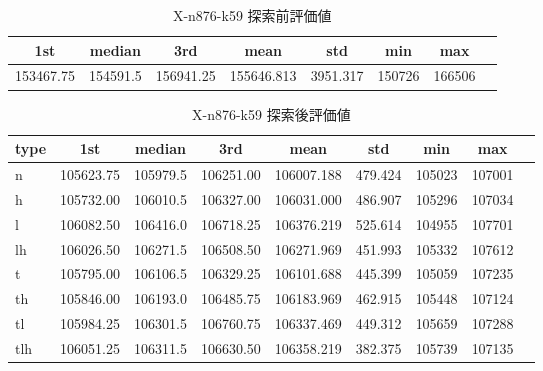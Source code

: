 \begin{table}[htbp]
    \centering
    \caption{X-n876-k59 探索前評価値}
    \begin{tabular}{|l|l|l|l|l|l|l|l|}\hline
    \multicolumn{1}{|c|}{\textbf{1st}}
    &\multicolumn{1}{c|}{\textbf{median}}
    &\multicolumn{1}{c|}{\textbf{3rd}}
    &\multicolumn{1}{c|}{\textbf{mean}}
    &\multicolumn{1}{c|}{\textbf{std}}
    &\multicolumn{1}{c|}{\textbf{min}}
    &\multicolumn{1}{c|}{\textbf{max}}\\\hline
	153467.75 & 154591.5 & 156941.25 & 155646.813 & 3951.317 & 150726 & 166506\\\hline
	\end{tabular}
\end{table}
\begin{table}[htbp]
    \centering
    \caption{X-n876-k59 探索後評価値}
    \begin{tabular}{|l|l|l|l|l|l|l|l|l|}\hline
    \multicolumn{1}{|c|}{\textbf{type}}
    &\multicolumn{1}{|c|}{\textbf{1st}}
    &\multicolumn{1}{c|}{\textbf{median}}
    &\multicolumn{1}{c|}{\textbf{3rd}}
    &\multicolumn{1}{c|}{\textbf{mean}}
    &\multicolumn{1}{c|}{\textbf{std}}
    &\multicolumn{1}{c|}{\textbf{min}}
    &\multicolumn{1}{c|}{\textbf{max}}\\\hline
	n & 105623.75 & 105979.5 & 106251.00 & 106007.188 & 479.424 & 105023 & 107001\\\hline
	h & 105732.00 & 106010.5 & 106327.00 & 106031.000 & 486.907 & 105296 & 107034\\\hline
	l & 106082.50 & 106416.0 & 106718.25 & 106376.219 & 525.614 & 104955 & 107701\\\hline
	lh & 106026.50 & 106271.5 & 106508.50 & 106271.969 & 451.993 & 105332 & 107612\\\hline
	t & 105795.00 & 106106.5 & 106329.25 & 106101.688 & 445.399 & 105059 & 107235\\\hline
	th & 105846.00 & 106193.0 & 106485.75 & 106183.969 & 462.915 & 105448 & 107124\\\hline
	tl & 105984.25 & 106301.5 & 106760.75 & 106337.469 & 449.312 & 105659 & 107288\\\hline
	tlh & 106051.25 & 106311.5 & 106630.50 & 106358.219 & 382.375 & 105739 & 107135\\\hline
	\end{tabular}
\end{table}
